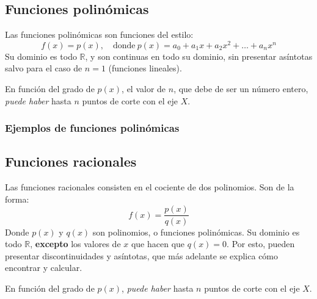 \documentclass[sans]{apuntes}
\begin{document}
\subsection{Funciones polinómicas}
Las funciones polinómicas son funciones del estilo:
\[f(x) = p(x), \quad \text{donde}\ p(x) = a_0 + a_1 x + a_2 x^2 + \dots + a_n x^n\]
Su dominio es todo $\mathbb{R}$, y son continuas en todo su dominio, sin presentar asíntotas salvo para el caso de $n = 1$ (funciones lineales).
\par En función del grado de $p(x)$, el valor de $n$, que debe de ser un número entero, \emph{puede haber} hasta $n$ puntos de corte con el eje $X$.

\begin{examplebox}
	\subsubsection{Ejemplos de funciones polinómicas}
		\begin{minipage}{0.45\linewidth}
		\captionsetup{type=figure}
		\centering
		\end{minipage}
		\hfill
		\begin{minipage}{0.45\linewidth}
		\captionsetup{type=figure}
		\centering
		\end{minipage}
\end{examplebox}

\subsection{Funciones racionales}
Las funciones racionales consisten en el cociente de dos polinomios. Son de la forma:
\[f(x) = \frac{p(x)}{q(x)}\]
Donde $p(x)$ y $q(x)$ son polinomios, o funciones polinómicas. Su dominio es todo $\mathbb{R}$, \textbf{excepto} los valores de $x$ que hacen que $q(x) = 0$. Por esto, pueden presentar discontinuidades y asíntotas, que más adelante se explica cómo encontrar y calcular.
\par En función del grado de $p(x)$, \emph{puede haber} hasta $n$ puntos de corte con el eje $X$.
\par {}
\end{document}
